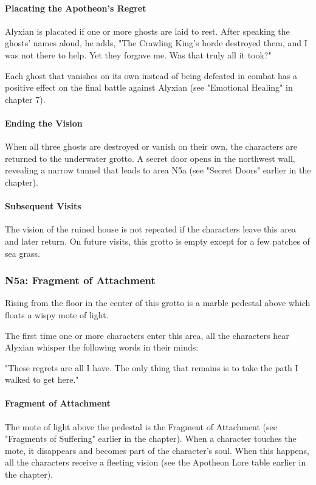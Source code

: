 \documentclass[10pt,a4paper,twoside,twocolumn,openany,nodeprecatedcode]{dndbook}
\begin{document}
\paragraph{Placating the Apotheon's Regret}
Alyxian is placated if one or more ghosts are laid to rest. After speaking the ghosts' names aloud, he adds, "The Crawling King's horde destroyed them, and I was not there to help. Yet they forgave me. Was that truly all it took?"

Each ghost that vanishes on its own instead of being defeated in combat has a positive effect on the final battle against Alyxian (see "Emotional Healing" in chapter 7).

\paragraph{Ending the Vision}
When all three ghosts are destroyed or vanish on their own, the characters are returned to the underwater grotto. A secret door opens in the northwest wall, revealing a narrow tunnel that leads to area N5a (see "Secret Doors" earlier in the chapter).

\paragraph{Subsequent Visits}
The vision of the ruined house is not repeated if the characters leave this area and later return. On future visits, this grotto is empty except for a few patches of sea grass.

\subsubsection{N5a: Fragment of Attachment}
\begin{DndReadAloud}{}
Rising from the floor in the center of this grotto is a marble pedestal above which floats a wispy mote of light.

\end{DndReadAloud}

The first time one or more characters enter this area, all the characters hear Alyxian whisper the following words in their minds:

\begin{DndReadAloud}{}
"These regrets are all I have. The only thing that remains is to take the path I walked to get here."

\end{DndReadAloud}

\paragraph{Fragment of Attachment}
The mote of light above the pedestal is the Fragment of Attachment (see "Fragments of Suffering" earlier in the chapter). When a character touches the mote, it disappears and becomes part of the character's soul. When this happens, all the characters receive a fleeting vision (see the Apotheon Lore table earlier in the chapter).
\end{document}
